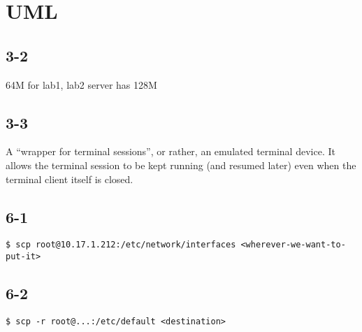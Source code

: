 
\section{UML}
\subsection{3-2}
64M for lab1, lab2 server has 128M

\subsection{3-3}
A ``wrapper for terminal sessions'', or rather, an emulated terminal device. It allows the terminal session to be kept running (and resumed later) even when the terminal client itself is closed.

\subsection{6-1}
\verb=$ scp root@10.17.1.212:/etc/network/interfaces <wherever-we-want-to-put-it>=

\subsection{6-2}
\verb=$ scp -r root@...:/etc/default <destination>=


